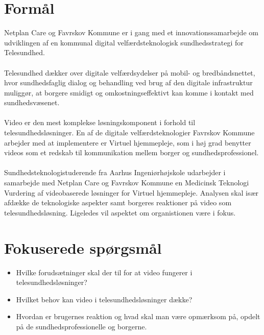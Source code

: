 \section{Formål}
Netplan Care og Favrskov Kommune er i gang med et innovationssamarbejde om udviklingen af en kommunal digital velfærdsteknologisk sundhedsstrategi for Telesundhed. 
\\ \\
Telesundhed dækker over digitale velfærdsydelser på mobil- og bredbåndsnettet, hvor sundhedsfaglig dialog og behandling ved brug af den digitale infrastruktur muliggør, at borgere smidigt og omkostningseffektivt kan komme i kontakt med sundhedsvæsenet.    
\\ \\
Video er den mest komplekse løsningskomponent i forhold til telesundhedsløsninger. En af de digitale velfærdsteknologier Favrskov Kommune arbejder med at implementere er Virtuel hjemmepleje, som i høj grad benytter videos som et redskab til kommunikation mellem borger og sundhedsprofessionel. 
\\ \\
Sundhedsteknologistuderende fra Aarhus Ingeniørhøjskole udarbejder i samarbejde med Netplan Care og Favrskov Kommune en Medicinsk Teknologi Vurdering af videobaserede løsninger for Virtuel hjemmepleje. Analysen skal især afdække de teknologiske aspekter samt borgeres reaktioner på video som telesundhedsløsning. Ligeledes vil aspektet om organistionen være i fokus. 

\section{Fokuserede spørgsmål}
\begin{itemize}
	\item Hvilke forudsætninger skal der til for at video fungerer i telesundhedsløsninger? 
	\item Hvilket behov kan video i telesundhedsløsninger dække?
	\item Hvordan er brugernes reaktion og hvad skal man være opmærksom på, opdelt på de sundhedsprofessionelle og borgerne. 
\end{itemize}

